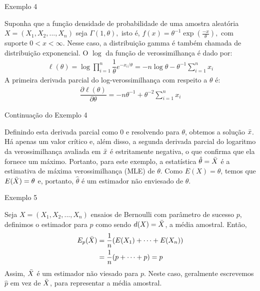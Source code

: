 \documentclass[12pt]{beamer}
\begin{document}
\begin{frame}{Exemplo 4}
\begin{block}{}
\justifying
Suponha que a função densidade de probabilidade de uma amostra aleatória $X=(X_{1},X_{2},...,X_{n})$ seja $\Gamma(1,\theta),$ isto é, $f(x)=\theta^{-1}\exp{(\frac{-x}{\theta})},$ com suporte $0<x<\infty.$ Nesse caso, a distribuição gamma é também chamada de distribuição exponencial. O $\log{}$ da função de verossimilhança é dado por:
\begin{align*}
    \ell(\theta)=\log{{\displaystyle \prod_{i=1}^{n}}\dfrac{1}{\theta}e^{-x_{i}/\theta}}=-n\log{\theta}-\theta^{-1}{\displaystyle \sum_{i=1}^{n}x_{i}}
\end{align*}
A primeira derivada parcial do log-verossimilhança com respeito a $\theta$ é:
\begin{align*}
    \dfrac{\partial \ell(\theta)}{\partial \theta}=-n\theta^{-1}+\theta^{-2}{\displaystyle \sum_{i=1}^{n}x_{i}}
\end{align*}
\end{block}
\end{frame}

\begin{frame}{Continuação do Exemplo 4}
\begin{block}{}
\justifying
Definindo esta derivada parcial como $0$ e resolvendo para $\theta$, obtemos a solução $\Bar{x}$. Há apenas um valor crítico e, além disso, a segunda derivada parcial do logaritmo da verossimilhança avaliada em $\Bar{x}$ é estritamente negativa, o que confirma que ela fornece um máximo. Portanto, para este exemplo, a estatística $\hat{\theta} = \Bar{X}$ é a estimativa de máxima verossimilhança (MLE) de $\theta$. Como $E(X) = \theta$, temos que $E(\Bar{X}) = \theta$ e, portanto, $\hat{\theta}$ é um estimador não enviesado de $\theta$.
\end{block}
\end{frame}

\begin{frame}{Exemplo 5}
\begin{block}{}
\justifying
Seja $X=(X_{1},X_{2},...,X_{n})$ ensaios de Bernoulli com parâmetro de sucesso $p$, definimos o estimador para $p$ como sendo $d(X) = \Bar{X}$, a média amostral. Então,
\begin{align*}
    E_{p}(\Bar{X})&=\dfrac{1}{n}(E(X_{1})+\cdots+E(X_{n}))\\
    &=\dfrac{1}{n}(p+\cdots+p)=p
\end{align*}
Assim, $\Bar{X}$ é um estimador não viesado para $p.$ Neste caso, geralmente escrevemos $\hat{p}$ em vez de $\Bar{X}$, para representar a média amostral. 
\end{block}
\end{frame}
\end{document}
